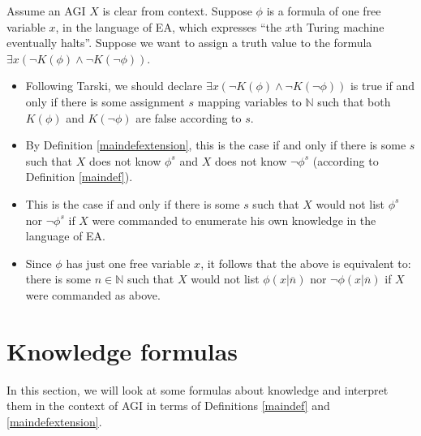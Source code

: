 \documentclass[runningheads]{llncs}
\begin{document}
\begin{example}
  Assume an AGI $X$ is clear from context.
  Suppose $\phi$ is a formula of one free variable $x$, in the language of EA,
  which expresses ``the $x$th Turing machine eventually halts''. Suppose we want to
  assign a truth value to the formula $\exists x (\neg K(\phi)\wedge \neg K(\neg\phi))$.
  \begin{itemize}
  \item Following Tarski, we should declare $\exists x (\neg K(\phi)\wedge\neg K(\neg \phi))$
  is true if and only if there is some assignment $s$ mapping variables to $\mathbb N$
  such that both $K(\phi)$ and $K(\neg\phi)$ are false according to $s$.
  \item By Definition \ref{maindefextension}, this is the case if and only if
  there is some $s$ such that
  $X$ does not know $\phi^s$ and $X$ does not know $\neg\phi^s$
  (according to Definition \ref{maindef}).
  \item
  This is the case if and only if there is some $s$ such that $X$ would not
  list $\phi^s$ nor $\neg\phi^s$ if $X$ were commanded
  to enumerate his own knowledge in the language of EA.
  \item
  Since $\phi$ has just one free variable $x$, it follows that the above is equivalent to:
  there is some $n\in\mathbb N$ such that $X$ would not list $\phi(x|\overline n)$
  nor $\neg\phi(x|\overline n)$
  if $X$ were commanded as above.
  \end{itemize}
\end{example}

\section{Knowledge formulas}
\label{appsection}

In this section, we will look at some formulas about knowledge and interpret them in the
context of AGI in terms of Definitions \ref{maindef} and \ref{maindefextension}.
\end{document}
